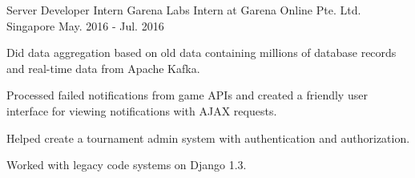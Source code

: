 

\begin{cventries}

	\cventry
	{Server Developer Intern} %
	{Garena Labs Intern at Garena Online Pte. Ltd.} %
	{Singapore} %
	{May. 2016 - Jul. 2016} %
	{
		\begin{cvitems} %
		\item {Did data aggregation based on old data containing millions of database records and real-time data from Apache Kafka.}
		\item {Processed failed notifications from game APIs and created a friendly user interface for viewing notifications with AJAX requests.}
		\item {Helped create a tournament admin system with authentication and authorization.}
		\item {Worked with legacy code systems on Django 1.3.}
		\end{cvitems}
	}

\end{cventries}
